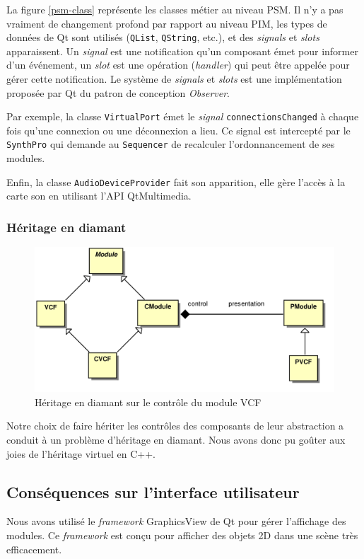 La figure \ref{psm-class} représente les classes métier au niveau PSM. Il n'y a
pas vraiment de changement profond par rapport au niveau PIM, les
types de données de Qt sont utilisés (\verb!QList!, \verb!QString!,
etc.), et des \emph{signals} et \emph{slots} apparaissent. Un
\emph{signal} est une notification qu'un composant émet pour
informer d'un événement, un \emph{slot} est une opération
(\emph{handler}) qui peut être appelée pour gérer cette
notification. Le système de \emph{signals} et \emph{slots} est une
implémentation proposée par Qt du patron de conception
\emph{Observer}.

Par exemple, la classe \verb!VirtualPort! émet le \emph{signal}
\verb!connectionsChanged! à chaque fois qu'une connexion ou une
déconnexion a lieu. Ce signal est intercepté par le \verb!SynthPro!
qui demande au \verb!Sequencer! de recalculer l'ordonnancement de
ses modules.

Enfin, la classe \verb!AudioDeviceProvider! fait son apparition,
elle gère l'accès à la carte son en utilisant l'API QtMultimedia.

\subsubsection{Héritage en diamant}

\begin{figure}[htb]
\centering
\includegraphics[width=12cm]{../img/ps/pacmodule-psm.pdf}
\caption{Héritage en diamant sur le contrôle du module VCF}
\end{figure}

Notre choix de faire hériter les contrôles des composants de leur
abstraction a conduit à un problème d'héritage en diamant. Nous
avons donc pu goûter aux joies de l'héritage virtuel en C++.

\subsection{Conséquences sur l'interface utilisateur}

Nous avons utilisé le \emph{framework} GraphicsView de Qt pour
gérer l'affichage des modules. Ce \emph{framework} est conçu pour
afficher des objets 2D dans une scène très efficacement.

